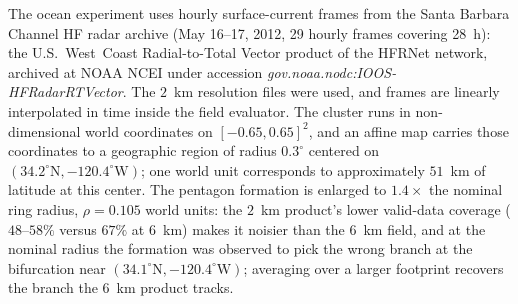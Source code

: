 \documentclass[lettersize,journal]{IEEEtran}
\begin{document}
%
%
%
%
%

The ocean experiment uses hourly surface-current frames from the
Santa Barbara Channel HF radar archive (May 16--17, 2012, 29 hourly
frames covering 28~h): the U.S.~West~Coast Radial-to-Total Vector
product of the HFRNet network, archived at NOAA NCEI under accession
\textit{gov.noaa.nodc:IOOS-HFRadarRTVector}. The $2$~km resolution
files were used, and frames are linearly interpolated in time inside
the field evaluator.
The cluster runs in
non-dimensional world coordinates on $[-0.65, 0.65]^2$, and an affine
map carries those coordinates to a geographic region of radius
$0.3^{\circ}$ centered on $(34.2^{\circ}\mathrm{N},
-120.4^{\circ}\mathrm{W})$; one
world unit corresponds to approximately $51$~km of latitude at this
center. The pentagon formation is enlarged to $1.4\times$ the nominal
ring radius, $\rho = 0.105$ world units: the $2$~km product's lower
valid-data coverage ($48$--$58\%$ versus $67\%$ at $6$~km) makes it
noisier than the $6$~km field, and at the nominal radius the formation
was observed to pick the wrong branch at the bifurcation near
$(34.1^{\circ}\mathrm{N}, -120.4^{\circ}\mathrm{W})$; averaging over a
larger footprint recovers the branch the $6$~km product tracks.
\end{document}
